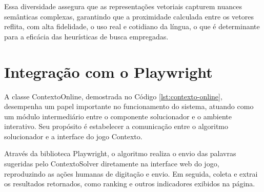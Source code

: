Essa diversidade assegura que as representações vetoriais capturem nuances semânticas complexas, garantindo que a proximidade calculada entre os vetores reflita, com alta fidelidade, o uso real e cotidiano da língua, o que é determinante para a eficácia das heurísticas de busca empregadas.

\section{Integração com o Playwright}
A classe ContextoOnline, demostrada no Código \ref{lst:contexto-online}, desempenha um papel importante no funcionamento do sistema, atuando como um módulo intermediário entre o componente solucionador e o ambiente interativo. Seu propósito é estabelecer a comunicação entre o algoritmo solucionador e a interface do jogo Contexto.

Através da biblioteca Playwright, o algoritmo realiza o envio das palavras sugeridas pelo ContextoSolver diretamente na interface web do jogo, reproduzindo as ações humanas de digitação e envio. Em seguida, coleta e extrai os resultados retornados, como ranking e outros indicadores exibidos na página.

